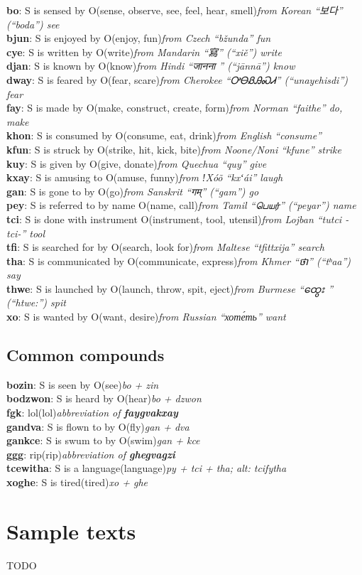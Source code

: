 \documentclass{article}
\newcommand{\dfn}[4]{\noindent\textbf{#1}: #2\quad(#3)\hfill\emph{#4}\\}
\begin{document}
\dfn{bo}{S is sensed by O}{sense, observe, see, feel, hear, smell}{from Korean ``보다'' (``boda'') see}
\dfn{bjun}{S is enjoyed by O}{enjoy, fun}{from Czech ``bžunda'' fun}
\dfn{cye}{S is written by O}{write}{from Mandarin ``寫'' (``xiě'') write}
\dfn{djan}{S is known by O}{know}{from Hindi ``{\devanagarifont जानना }'' (``jānnā'') know}
\dfn{dway}{S is feared by O}{fear, scare}{from Cherokee ``{\cherokeefont ᎤᎾᏰᎯᏍᏗ}'' (``unayehisdi'') fear}
\dfn{fay}{S is made by O}{make, construct, create, form}{from Norman ``faithe'' do, make}
\dfn{khon}{S is consumed by O}{consume, eat, drink}{from English ``consume''}
\dfn{kfun}{S is struck by O}{strike, hit, kick, bite}{from Noone/Noni ``kfune'' strike}
\dfn{kuy}{S is given by O}{give, donate}{from Quechua ``quy'' give}
\dfn{kxay}{S is amusing to O}{amuse, funny}{from ǃXóõ ``kxʻái'' laugh}
\dfn{gan}{S is gone to by O}{go}{from Sanskrit ``{\devanagarifont गम्}'' (``gam'') go}
\dfn{pey}{S is referred to by name O}{name, call}{from Tamil ``{\tamilfont பெயர்}'' (``peyar'') name}
\dfn{tci}{S is done with instrument O}{instrument, tool, utensil}{from Lojban ``tutci -tci-'' tool}
\dfn{tfi}{S is searched for by O}{search, look for}{from Maltese ``tfittxija'' search}
\dfn{tha}{S is communicated by O}{communicate, express}{from Khmer ``{\khmerfont ថា}''  (``tʰaa'') say}
\dfn{thwe}{S is launched by O}{launch, throw, spit, eject}{from Burmese ``{\myanmarfont ထွေး }'' (``htwe:'') spit}
\dfn{xo}{S is wanted by O}{want, desire}{from Russian ``хоте́ть'' want}

\subsection{Common compounds}

\dfn{bozin}{S is seen by O}{see}{bo + zin}
\dfn{bodzwon}{S is heard by O}{hear}{bo + dzwon}
\dfn{fgk}{lol}{lol}{abbreviation of \textbf{faygvakxay}}
\dfn{gandva}{S is flown to by O}{fly}{gan + dva}
\dfn{gankce}{S is swum to by O}{swim}{gan + kce}
\dfn{ggg}{rip}{rip}{abbreviation of \textbf{ghegvagzi}}
\dfn{tcewitha}{S is a language}{language}{py + tci + tha; alt: tcifytha}
\dfn{xoghe}{S is tired}{tired}{xo + ghe}

\section{Sample texts}

TODO
\end{document}
